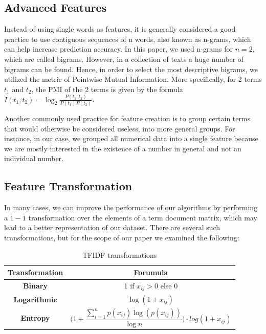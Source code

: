 \documentclass[10pt,journal,compsoc]{IEEEtran}
\begin{document}
\subsection{Advanced Features}
Instead of using single words as features, it is generally 
considered a good practice to use contiguous sequences of
n words, also known as n-grams, which can help increase
prediction accuracy.
In this paper, we used n-grams for $n=2$, which are called
bigrams.
However, in a collection of texts a huge number of bigrams
can be found.
Hence, in order to select the most descriptive bigrams, 
we utilized the metric of Pointwise Mutual Information.
More specifically, for 2 terms $t_1$ and $t_2$, the
PMI of the 2 terms is given by the formula 
$I(t_1,t_2)=\log_2\frac{P(t_1,t_2)}{P(t_1)P(t_2)}$.

Another commonly used practice for feature creation 
is to group certain terms that would otherwise be
considered useless, into more general groups.
For instance, in our case, we grouped all numerical
data into a single feature because we are mostly
interested in the existence of a number in general
and not an individual number.

\subsection{Feature Transformation}
In many cases, we can improve the performance of
our algorithms by performing a $1-1$ transformation
over the elements of a term document matrix, which
may lead to a better representation of our dataset.
There are several such transformations, but for
the scope of our paper we examined the following:

\begin{table}[!h]
\renewcommand{\arraystretch}{2}
\caption{TFIDF transformations}
\label{transformation}
\centering
\begin{tabular}{|c|c|}
\hline
Transformation & Forumula\\
\hline
\textbf{Binary} & 1 if $x_{ij}>0$ else 0\\
\hline
\textbf{Logarithmic} & $\log(1+x_{ij})$\\
\hline
\textbf{Entropy} & $\Bigg(1+\dfrac{\sum_{i=1}^{n}p(x_{ij})\log(p(x_{ij}))}{\log{n}}\Bigg)\cdot log(1+x_{ij})$\\
\hline
\end{tabular}
\end{table}
 
\end{document}
